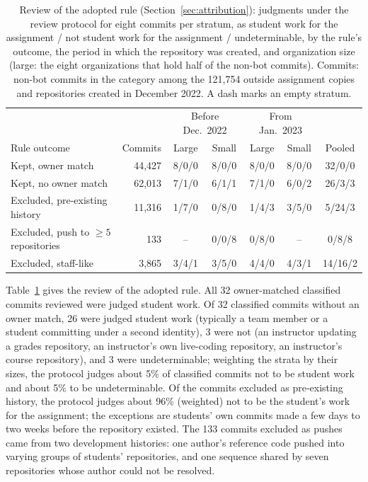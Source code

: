 \documentclass[acmsmall,screen,review,anonymous]{acmart}
\begin{document}
\begin{table}
\caption{Review of the adopted rule (Section~\ref{sec:attribution}): judgments under the review protocol for eight commits per stratum, as student work for the assignment / not student work for the assignment / undeterminable, by the rule's outcome, the period in which the repository was created, and organization size (large: the eight organizations that hold half of the non-bot commits). Commits: non-bot commits in the category among the 121,754 outside assignment copies and repositories created in December 2022. A dash marks an empty stratum.}
\label{tab:review}
\footnotesize
\setlength{\tabcolsep}{4pt}
\begin{tabular}{@{}l r c c c c c@{}}
\toprule
 & & \multicolumn{2}{c}{Before Dec.\ 2022} & \multicolumn{2}{c}{From Jan.\ 2023} & \\
Rule outcome & Commits & Large & Small & Large & Small & Pooled \\
\midrule
Kept, owner match & 44,427 & 8/0/0 & 8/0/0 & 8/0/0 & 8/0/0 & 32/0/0 \\
Kept, no owner match & 62,013 & 7/1/0 & 6/1/1 & 7/1/0 & 6/0/2 & 26/3/3 \\
Excluded, pre-existing history & 11,316 & 1/7/0 & 0/8/0 & 1/4/3 & 3/5/0 & 5/24/3 \\
Excluded, push to $\geq 5$ repositories & 133 & -- & 0/0/8 & 0/8/0 & -- & 0/8/8 \\
Excluded, staff-like & 3,865 & 3/4/1 & 3/5/0 & 4/4/0 & 4/3/1 & 14/16/2 \\
\bottomrule
\end{tabular}
\end{table}

Table~\ref{tab:review} gives the review of the adopted rule. All 32 owner-matched classified commits reviewed were judged student work. Of 32 classified commits without an owner match, 26 were judged student work (typically a team member or a student committing under a second identity), 3 were not (an instructor updating a grades repository, an instructor's own live-coding repository, an instructor's course repository), and 3 were undeterminable; weighting the strata by their sizes, the protocol judges about 5\% of classified commits not to be student work and about 5\% to be undeterminable. Of the commits excluded as pre-existing history, the protocol judges about 96\% (weighted) not to be the student's work for the assignment; the exceptions are students' own commits made a few days to two weeks before the repository existed. The 133 commits excluded as pushes came from two development histories: one author's reference code pushed into varying groups of students' repositories, and one sequence shared by seven repositories whose author could not be resolved.
\end{document}
